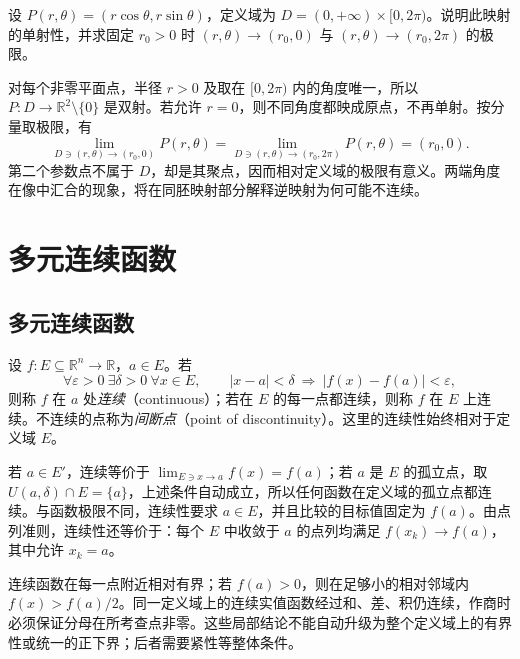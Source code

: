 \documentclass[UTF8,12pt,a4paper,fontset=fandol]{ctexbook}
\begin{document}
\begin{example}
\label{ex:polar-map-boundary-limits}
设 $P(r,\theta)=(r\cos\theta,r\sin\theta)$，定义域为 $D=(0,+\infty)\times[0,2\pi)$。说明此映射的单射性，并求固定 $r_0>0$ 时 $(r,\theta)\to(r_0,0)$ 与 $(r,\theta)\to(r_0,2\pi)$ 的极限。
\end{example}

\begin{solve}
对每个非零平面点，半径 $r>0$ 及取在 $[0,2\pi)$ 内的角度唯一，所以 $P:D\to\mathbb R^2\setminus\{0\}$ 是双射。若允许 $r=0$，则不同角度都映成原点，不再单射。按分量取极限，有
\[
    \lim_{D\ni(r,\theta)\to(r_0,0)}P(r,\theta)
       =\lim_{D\ni(r,\theta)\to(r_0,2\pi)}P(r,\theta)=(r_0,0).
\]
第二个参数点不属于 $D$，却是其聚点，因而相对定义域的极限有意义。两端角度在像中汇合的现象，将在同胚映射部分解释逆映射为何可能不连续。
\end{solve}

\section{多元连续函数}
\label{sec:continuous-multivariable-functions}

\subsection{多元连续函数}
\label{subsec:continuous-multivariable-functions}

\begin{definition}
\label{def:relative-multivariable-continuity}
设 $f:E\subseteq\mathbb R^n\to\mathbb R$，$a\in E$。若
\[
    \forall\varepsilon>0\ \exists\delta>0\ \forall x\in E,
    \qquad |x-a|<\delta\ \Longrightarrow\ |f(x)-f(a)|<\varepsilon,
\]
则称 $f$ 在 $a$ 处\emph{连续}（continuous）；若在 $E$ 的每一点都连续，则称 $f$ 在 $E$ 上连续。不连续的点称为\emph{间断点}（point of discontinuity）。这里的连续性始终相对于定义域 $E$。
\end{definition}

若 $a\in E'$，连续等价于 $\lim_{E\ni x\to a}f(x)=f(a)$；若 $a$ 是 $E$ 的孤立点，取 $U(a,\delta)\cap E=\{a\}$，上述条件自动成立，所以任何函数在定义域的孤立点都连续。与函数极限不同，连续性要求 $a\in E$，并且比较的目标值固定为 $f(a)$。由点列准则，连续性还等价于：每个 $E$ 中收敛于 $a$ 的点列均满足 $f(x_k)\to f(a)$，其中允许 $x_k=a$。

连续函数在每一点附近相对有界；若 $f(a)>0$，则在足够小的相对邻域内 $f(x)>f(a)/2$。同一定义域上的连续实值函数经过和、差、积仍连续，作商时必须保证分母在所考查点非零。这些局部结论不能自动升级为整个定义域上的有界性或统一的正下界；后者需要紧性等整体条件。
\end{document}

